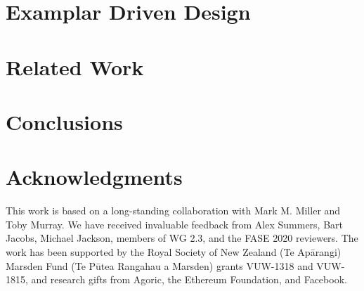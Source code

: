 \documentclass[runningheads]{llncs}
\newcommand{\sd}[1]{#1} %
\newcommand{\sophia}[1]{#1} %
\newcommand{\susan}[1]{#1} %
\begin{document}





\section{Examplar Driven Design}
\label{sect:discussion} 


\section{Related Work}
\label{sect:related}


\section{Conclusions}
\label{sect:conclusion}


\section{Acknowledgments}

\sophia{This work is based on a long-standing collaboration with Mark M. Miller and Toby Murray.
We have received invaluable feedback from Alex Summers, Bart Jacobs, Michael Jackson, members of WG 2.3, 
and the FASE 2020  reviewers.
The work has been supported by the 
Royal Society of New Zealand (Te Ap\={a}rangi) Marsden Fund (Te P\={u}tea Rangahau a Marsden)
grants VUW-1318 and VUW-1815, and research gifts from Agoric\susan{, the Ethereum Foundation,} and
Facebook.}





\newpage
\appendix
\end{document}
